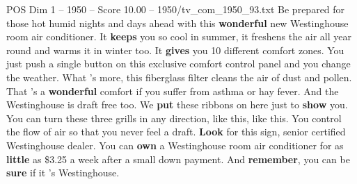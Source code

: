 \begin{textsample}{POS Dim 1 – 1950 – Score 10.00 – 1950/tv\_com\_1950\_93.txt}  \label{ex:f1_pos_007}
Be prepared for those hot humid nights and days ahead with this \textbf{wonderful} new Westinghouse room air conditioner.
It \textbf{keeps} you so cool in summer, it freshens the air all year round and warms it in winter too.
It \textbf{gives} you 10 different comfort zones.
You just push a single button on this exclusive comfort control panel and you change the weather.
What 's more, this fiberglass filter cleans the air of dust and pollen.
That 's a \textbf{wonderful} comfort if you suffer from asthma or hay fever.
And the Westinghouse is draft free too.
We \textbf{put} these ribbons on here just to \textbf{show} you.
You can turn these three grills in any direction, like this, like this.
You control the flow of air so that you never feel a draft. \textbf{Look} for this sign, senior certified Westinghouse dealer.
You can \textbf{own} a Westinghouse room air conditioner for as \textbf{little} as \$3.25 a week after a small down payment.
And \textbf{remember}, you can be \textbf{sure} if it 's Westinghouse.

\end{textsample}
